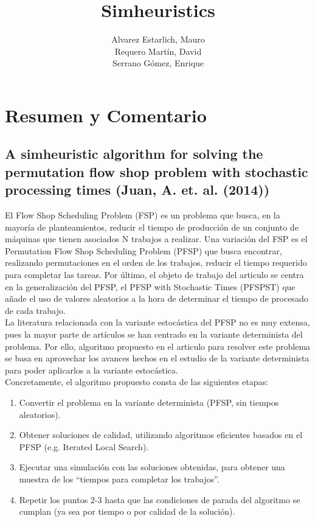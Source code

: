 \documentclass[11pt]{article} %
\title{Simheuristics}
\author{Alvarez Estarlich, Mauro \\ Requero Martín, David \\ Serrano Gómez, Enrique}
\begin{document}
\maketitle

\section{Resumen y Comentario}

\subsection{A simheuristic algorithm for solving the permutation flow shop problem with stochastic processing times (Juan, A. et. al. (2014))}

El Flow Shop Scheduling Problem (FSP) es un problema que busca, en la mayoría de planteamientos, reducir el tiempo de producción de un conjunto de máquinas que tienen asociados N trabajos a realizar. Una variación del FSP es el Permutation Flow Shop Scheduling Problem (PFSP) que busca encontrar, realizando permutaciones en el orden de los trabajos, reducir el tiempo requerido para completar las tareas. Por último, el objeto de trabajo del articulo se centra en la generalización del PFSP, el PFSP with Stochastic Times (PFSPST) que añade el uso de valores aleatorios a la hora de determinar el tiempo de procesado de cada trabajo.\\[0.2cm]
La literatura relacionada con la variante estocástica del PFSP no es muy extensa, pues la mayor parte de artículos se han centrado en la variante determinista del problema. Por ello, algoritmo propuesto en el articulo para resolver este problema se basa en aprovechar los avances hechos en el estudio de la variante determinista para poder aplicarlos a la variante estocástica.\\[0.2cm]
Concretamente, el algoritmo propuesto consta de las siguientes etapas:
\begin{enumerate}
\item Convertir el problema en la variante determinista (PFSP, sin tiempos aleatorios).
\item Obtener soluciones de calidad, utilizando algoritmos eficientes basados en el PFSP (e.g. Iterated Local Search).
\item Ejecutar una simulación con las soluciones obtenidas, para obtener una muestra de los “tiempos para completar los trabajos”.
\item Repetir los puntos 2-3 hasta que las condiciones de parada del algoritmo se cumplan (ya sea por tiempo o por calidad de la solución). 
\end{enumerate}
\end{document}
